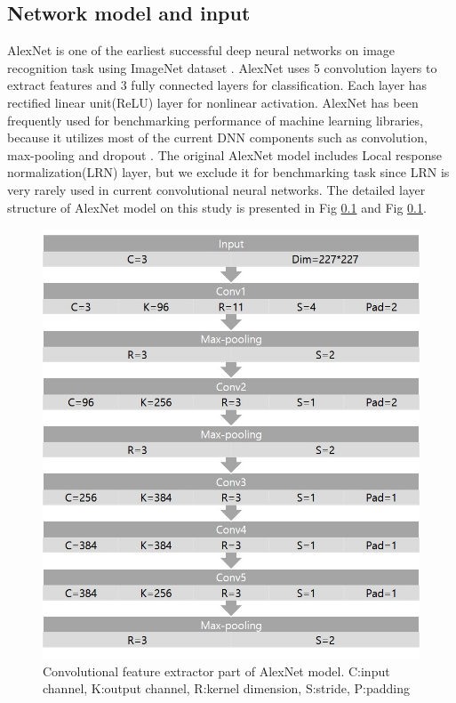 \documentclass[conference]{IEEEtran}
\begin{document}
\subsection{Network model and input}
AlexNet \cite{} is one of the earliest successful deep neural networks on image recognition task using ImageNet dataset \cite{}.
AlexNet uses 5 convolution layers to extract features and 3 fully connected layers for classification.
Each layer has rectified linear unit(ReLU) layer for nonlinear activation.
AlexNet has been frequently used for benchmarking performance of machine learning libraries, because it utilizes most of the current DNN components such as convolution, max-pooling and dropout \cite{}.
The original AlexNet model includes Local response normalization(LRN) layer, but we exclude it for benchmarking task since LRN is very rarely used in current convolutional neural networks.
The detailed layer structure of AlexNet model on this study is presented in Fig \ref{} and Fig \ref{}.


\begin{figure}
  \centering
  \includegraphics[width=\linewidth]{./figures/alexnet_conv.jpg}
  \caption{Convolutional feature extractor part of AlexNet model. C:input channel, K:output channel, R:kernel dimension, S:stride, P:padding}
  \label{fig_alexnet_conv}
\end{figure}
\end{document}

